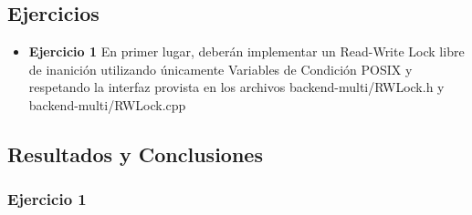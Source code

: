 
\subsection{Ejercicios}
\begin{itemize}
 \item \textbf{Ejercicio 1 }
 En primer lugar, deberán implementar un Read-Write Lock libre de inanición utilizando únicamente Variables de Condición POSIX 
 y  respetando la interfaz provista en los archivos backend-multi/RWLock.h y backend-multi/RWLock.cpp
\end{itemize}

\subsection{Resultados y Conclusiones}

\subsubsection[Resolución Ejercicio 1]{Ejercicio 1}
